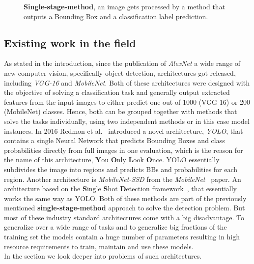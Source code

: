 \begin{figure}[!ht]
\begin{minipage}{.45\textwidth}

        \caption{\textbf{Single-stage-method}, an image gets processed by a method that outputs a Bounding Box and a classification label prediction.}
        \label{fig:joint-method}

    \end{minipage}
\end{figure}


\subsection{Existing work in the field}\label{subsec:existing-work-in-the-field}
As stated in the introduction, since the publication of \textit{AlexNet} a wide range of new computer vision, specifically object detection, architectures got released, including \textit{VGG-16} and \textit{MobileNet}.
Both of these architectures were designed with the objective of solving a classification task and generally output extracted features from the input images to either predict one out of 1000 (VGG-16) or 200 (MobileNet) classes.
Hence, both can be grouped together with methods that solve the tasks individually, using two independent methods or in this case model instances.
In 2016 Redmon et al.~\cite{yolo} introduced a novel architecture, \textit{YOLO}, that contains a single Neural Network that predicts Bounding Boxes and class probabilities directly from full images in one evaluation, which is the reason for the name of this architecture, \textbf{Y}ou \textbf{O}nly \textbf{L}ook \textbf{O}nce.
YOLO essentially subdivides the image into regions and predicts BBs and probabilities for each region.
Another architecture is \textit{MobileNet-SSD} from the \textit{MobileNet}~\cite{MobileNet} paper. An architecture based on the \textbf{S}ingle \textbf{S}hot \textbf{D}etection framework~\cite{SSD}, that essentially works the same way as YOLO.
Both of these methods are part of the previously mentioned \textbf{single-stage-method} approach to solve the detection problem.
But most of these industry standard architectures come with a big disadvantage.
To generalize over a wide range of tasks and to generalize big fractions of the training set the models contain a huge number of parameters resulting in high resource requirements to train, maintain and use these models.\\
In the  section we look deeper into problems of such architectures.
